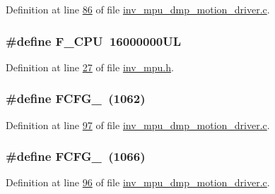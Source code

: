 Definition at line \hyperlink{inv__mpu__dmp__motion__driver_8c_source_l00086}{86} of file \hyperlink{inv__mpu__dmp__motion__driver_8c_source}{inv\+\_\+mpu\+\_\+dmp\+\_\+motion\+\_\+driver.\+c}.

\subsubsection[{\texorpdfstring{F\+\_\+\+C\+PU}{F_CPU}}]{\setlength{\rightskip}{0pt plus 5cm}\#define F\+\_\+\+C\+PU~16000000\+UL}\hypertarget{group___d_r_i_v_e_r_s_ga43bafb28b29491ec7f871319b5a3b2f8}{}\label{group___d_r_i_v_e_r_s_ga43bafb28b29491ec7f871319b5a3b2f8}


Definition at line \hyperlink{inv__mpu_8h_source_l00027}{27} of file \hyperlink{inv__mpu_8h_source}{inv\+\_\+mpu.\+h}.

\subsubsection[{\texorpdfstring{F\+C\+F\+G\+\_\+1}{FCFG_1}}]{\setlength{\rightskip}{0pt plus 5cm}\#define F\+C\+F\+G\+\_~(1062)}\hypertarget{group___d_r_i_v_e_r_s_ga9a7d63d6add8f9fdf9edc722a01aeb92}{}\label{group___d_r_i_v_e_r_s_ga9a7d63d6add8f9fdf9edc722a01aeb92}


Definition at line \hyperlink{inv__mpu__dmp__motion__driver_8c_source_l00097}{97} of file \hyperlink{inv__mpu__dmp__motion__driver_8c_source}{inv\+\_\+mpu\+\_\+dmp\+\_\+motion\+\_\+driver.\+c}.

\subsubsection[{\texorpdfstring{F\+C\+F\+G\+\_\+2}{FCFG_2}}]{\setlength{\rightskip}{0pt plus 5cm}\#define F\+C\+F\+G\+\_~(1066)}\hypertarget{group___d_r_i_v_e_r_s_gac0e79063d1a071c1a8bd3f7081e4299e}{}\label{group___d_r_i_v_e_r_s_gac0e79063d1a071c1a8bd3f7081e4299e}


Definition at line \hyperlink{inv__mpu__dmp__motion__driver_8c_source_l00096}{96} of file \hyperlink{inv__mpu__dmp__motion__driver_8c_source}{inv\+\_\+mpu\+\_\+dmp\+\_\+motion\+\_\+driver.\+c}.

